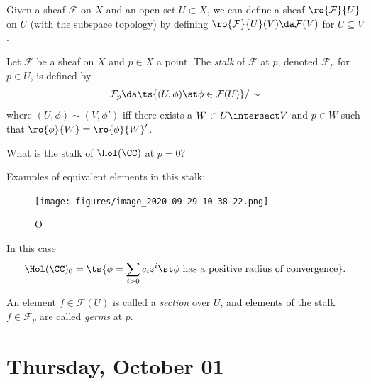 \begin{definition}

Given a sheaf \(\mathcal{F}\) on \(X\) and an open set \(U\subset X\),
we can define a sheaf \(\ro{\mathcal{F}}{U}\) on \(U\) (with the
subspace topology) by defining
\(\ro{\mathcal{F}}{U}(V) \da \mathcal{F}(V)\) for \(U\subseteq V\).

\end{definition}

\begin{definition}[Stalks]

Let \(\mathcal{F}\) be a sheaf on \(X\) and \(p\in X\) a point. The
\emph{stalk} of \(\mathcal{F}\) at \(p\), denoted \(\mathcal{F}_p\) for
\(p\in U\), is defined by
\begin{align*}  
\mathcal{F}_p \da \ts{(U, \phi) \st \phi \in \mathcal{F}(U) } / \sim
\end{align*} where \((U, \phi) \sim (V, \phi')\) iff there exists a
\(W\subset U\intersect V\) and \(p\in W\) such that
\(\ro{\phi}{W} = \ro{\phi}{W}'\).

\end{definition}

\begin{example}

What is the stalk of \(\Hol(\CC)\) at \(p=0\)?

Examples of equivalent elements in this stalk:

\begin{figure}
\centering
\texttt{[image: figures/image\_2020-09-29-10-38-22.png]}
\caption{O}
\end{figure}

In this case
\begin{align*}  
\Hol(\CC)_0 = \ts{\phi = \sum_{i>0}c_i z^i \st \phi \text{ has a positive radius of convergence}}
.\end{align*}

\end{example}

\begin{definition}[Sections]

An element \(f\in \mathcal{F}(U)\) is called a \emph{section} over
\(U\), and elements of the stalk \(f\in \mathcal{F}_p\) are called
\emph{germs} at \(p\).

\end{definition}

\hypertarget{thursday-october-01}{%
\section{Thursday, October 01}\label{thursday-october-01}}

